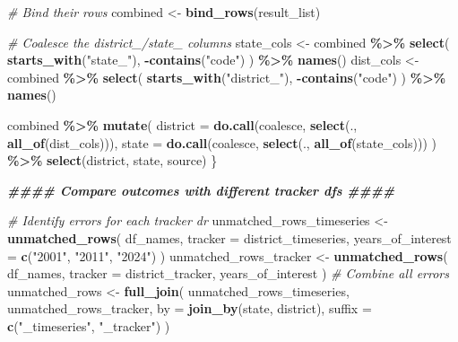 \documentclass[
]{article}
\newenvironment{Shaded}{\begin{snugshade}}{\end{snugshade}}
\newcommand{\AttributeTok}[1]{\textcolor[rgb]{0.13,0.29,0.53}{#1}}
\newcommand{\CommentTok}[1]{\textcolor[rgb]{0.56,0.35,0.01}{\textit{#1}}}
\newcommand{\DocumentationTok}[1]{\textcolor[rgb]{0.56,0.35,0.01}{\textbf{\textit{#1}}}}
\newcommand{\FunctionTok}[1]{\textcolor[rgb]{0.13,0.29,0.53}{\textbf{#1}}}
\newcommand{\NormalTok}[1]{#1}
\newcommand{\OtherTok}[1]{\textcolor[rgb]{0.56,0.35,0.01}{#1}}
\newcommand{\SpecialCharTok}[1]{\textcolor[rgb]{0.81,0.36,0.00}{\textbf{#1}}}
\newcommand{\StringTok}[1]{\textcolor[rgb]{0.31,0.60,0.02}{#1}}
\begin{document}
\begin{Shaded}
\begin{Highlighting}[]
    \CommentTok{\# Bind their rows}
\NormalTok{    combined }\OtherTok{\textless{}{-}} \FunctionTok{bind\_rows}\NormalTok{(result\_list)}

    \CommentTok{\# Coalesce the district\_/state\_ columns}
\NormalTok{    state\_cols }\OtherTok{\textless{}{-}}\NormalTok{ combined }\SpecialCharTok{\%\textgreater{}\%}
        \FunctionTok{select}\NormalTok{(}
            \FunctionTok{starts\_with}\NormalTok{(}\StringTok{"state\_"}\NormalTok{),}
            \SpecialCharTok{{-}}\FunctionTok{contains}\NormalTok{(}\StringTok{"code"}\NormalTok{)}
\NormalTok{        ) }\SpecialCharTok{\%\textgreater{}\%}
        \FunctionTok{names}\NormalTok{()}
\NormalTok{    dist\_cols }\OtherTok{\textless{}{-}}\NormalTok{ combined }\SpecialCharTok{\%\textgreater{}\%}
        \FunctionTok{select}\NormalTok{(}
            \FunctionTok{starts\_with}\NormalTok{(}\StringTok{"district\_"}\NormalTok{),}
            \SpecialCharTok{{-}}\FunctionTok{contains}\NormalTok{(}\StringTok{"code"}\NormalTok{)}
\NormalTok{        ) }\SpecialCharTok{\%\textgreater{}\%}
        \FunctionTok{names}\NormalTok{()}

\NormalTok{    combined }\SpecialCharTok{\%\textgreater{}\%}
        \FunctionTok{mutate}\NormalTok{(}
            \AttributeTok{district =} \FunctionTok{do.call}\NormalTok{(coalesce, }\FunctionTok{select}\NormalTok{(., }\FunctionTok{all\_of}\NormalTok{(dist\_cols))),}
            \AttributeTok{state =} \FunctionTok{do.call}\NormalTok{(coalesce, }\FunctionTok{select}\NormalTok{(., }\FunctionTok{all\_of}\NormalTok{(state\_cols)))}
\NormalTok{        ) }\SpecialCharTok{\%\textgreater{}\%}
        \FunctionTok{select}\NormalTok{(district, state, source)}
\NormalTok{\}}





\DocumentationTok{\#\#\#\# Compare outcomes with different tracker dfs \#\#\#\#}

\CommentTok{\# Identify errors for each tracker dr}
\NormalTok{unmatched\_rows\_timeseries }\OtherTok{\textless{}{-}} \FunctionTok{unmatched\_rows}\NormalTok{(}
\NormalTok{    df\_names, }\AttributeTok{tracker =}\NormalTok{ district\_timeseries,}
    \AttributeTok{years\_of\_interest =} \FunctionTok{c}\NormalTok{(}\StringTok{"2001"}\NormalTok{, }\StringTok{"2011"}\NormalTok{, }\StringTok{"2024"}\NormalTok{)}
\NormalTok{)}
\NormalTok{unmatched\_rows\_tracker }\OtherTok{\textless{}{-}} \FunctionTok{unmatched\_rows}\NormalTok{(}
\NormalTok{    df\_names, }\AttributeTok{tracker =}\NormalTok{ district\_tracker,}
\NormalTok{    years\_of\_interest}
\NormalTok{)}
\CommentTok{\# Combine all errors}
\NormalTok{unmatched\_rows }\OtherTok{\textless{}{-}} \FunctionTok{full\_join}\NormalTok{(}
\NormalTok{    unmatched\_rows\_timeseries, unmatched\_rows\_tracker,}
    \AttributeTok{by =} \FunctionTok{join\_by}\NormalTok{(state, district),}
    \AttributeTok{suffix =} \FunctionTok{c}\NormalTok{(}\StringTok{"\_timeseries"}\NormalTok{, }\StringTok{"\_tracker"}\NormalTok{)}
\NormalTok{)}



\end{Highlighting}
\end{Shaded}
\end{document}
